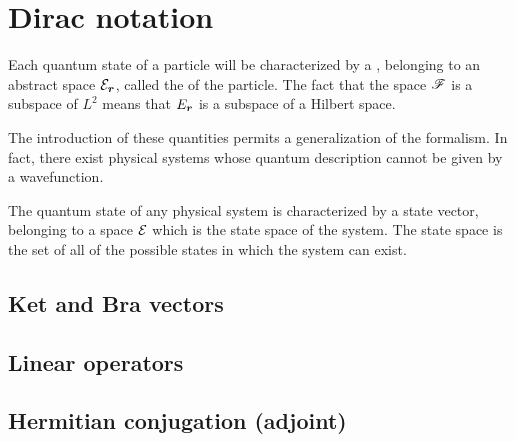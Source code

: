 \section{Dirac notation}
Each quantum state of a particle will be characterized by a ,  belonging to an abstract space $\mathcal{E}_{\bm{r}}$, called the
 of the particle. The fact that the space $\mathscr{F}$ is a subspace of $L^2$ means that $E_{\bm{r}}$ is a subspace 
of a Hilbert space.

The introduction of these quantities permits a generalization of the formalism. In fact,
there exist physical systems whose quantum description cannot be given by a wavefunction.

\begin{definition}
    The quantum state of any physical system is characterized by a state vector, belonging to a space $\mathcal{E}$ which is the state 
    space of the system. 
    The state space is the set of all of the possible states in which the system can exist.
\end{definition}
\subsection{Ket and Bra vectors}


\subsection{Linear operators}

\subsection{Hermitian conjugation (adjoint)}
